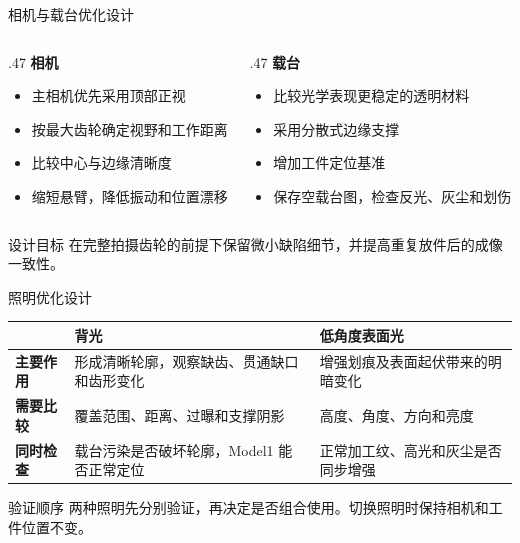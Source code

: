 \documentclass[aspectratio=169,10pt]{beamer}
\begin{document}
\begin{frame}{相机与载台优化设计}
  \begin{columns}[T,onlytextwidth]
    \begin{column}{.47\textwidth}
      \textbf{相机}
      \begin{itemize}
        \item 主相机优先采用顶部正视
        \item 按最大齿轮确定视野和工作距离
        \item 比较中心与边缘清晰度
        \item 缩短悬臂，降低振动和位置漂移
      \end{itemize}
    \end{column}
    \begin{column}{.47\textwidth}
      \textbf{载台}
      \begin{itemize}
        \item 比较光学表现更稳定的透明材料
        \item 采用分散式边缘支撑
        \item 增加工件定位基准
        \item 保存空载台图，检查反光、灰尘和划伤
      \end{itemize}
    \end{column}
  \end{columns}

  \vfill
  \begin{exampleblock}{设计目标}
    在完整拍摄齿轮的前提下保留微小缺陷细节，并提高重复放件后的成像一致性。
  \end{exampleblock}
\end{frame}

\begin{frame}{照明优化设计}
  \renewcommand{\arraystretch}{1.22}
  \begin{tabularx}{\linewidth}{>{\bfseries}p{2.2cm} X X}
    \toprule
    & 背光 & 低角度表面光 \\
    \midrule
    主要作用 & 形成清晰轮廓，观察缺齿、贯通缺口和齿形变化 & 增强划痕及表面起伏带来的明暗变化 \\
    需要比较 & 覆盖范围、距离、过曝和支撑阴影 & 高度、角度、方向和亮度 \\
    同时检查 & 载台污染是否破坏轮廓，Model1 能否正常定位 & 正常加工纹、高光和灰尘是否同步增强 \\
    \bottomrule
  \end{tabularx}

  \vspace{1em}
  \begin{block}{验证顺序}
    两种照明先分别验证，再决定是否组合使用。切换照明时保持相机和工件位置不变。
  \end{block}
\end{frame}
\end{document}
